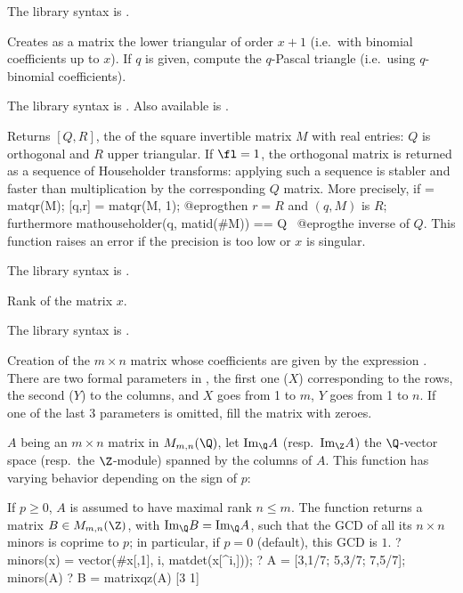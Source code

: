 The library syntax is .

\label{se:matpascal}
Creates as a matrix the lower triangular
 of order $x+1$ (i.e.~with binomial coefficients
up to $x$). If $q$ is given, compute the $q$-Pascal triangle (i.e.~using
$q$-binomial coefficients).

The library syntax is .
Also available is .

\label{se:matqr}
Returns $[Q,R]$, the  of the square invertible
matrix $M$ with real entries: $Q$ is orthogonal and $R$ upper triangular. If
$\fl=1$, the orthogonal matrix is returned as a sequence of Householder
transforms: applying such a sequence is stabler and faster than
multiplication by the corresponding $Q$ matrix.
More precisely, if
\bprog
  [Q,R] = matqr(M);
  [q,r] = matqr(M, 1);
@eprog\noindent then $r = R$ and $(q, M)$ is $R$;
furthermore
\bprog
  mathouseholder(q, matid(#M)) == Q~
@eprog\noindent the inverse of $Q$. This function raises an error if the
precision is too low or $x$ is singular.

The library syntax is .

\label{se:matrank}
Rank of the matrix $x$.

The library syntax is .

\label{se:matrix}
Creation of the
$m\times n$ matrix whose coefficients are given by the expression
. There are two formal parameters in , the first one
($X$) corresponding to the rows, the second ($Y$) to the columns, and $X$
goes from 1 to $m$, $Y$ goes from 1 to $n$. If one of the last 3 parameters
is omitted, fill the matrix with zeroes.

\label{se:matrixqz}
$A$ being an $m\times n$ matrix in $M_{m,n}(\Q)$, let
$\text{Im}_\Q A$ (resp.~$\text{Im}_\Z A$) the $\Q$-vector space
(resp.~the $\Z$-module) spanned by the columns of $A$. This function has
varying behavior depending on the sign of $p$:

If $p \geq 0$, $A$ is assumed to have maximal rank $n\leq m$. The function
returns a matrix $B\in M_{m,n}(\Z)$, with $\text{Im}_\Q B = \text{Im}_\Q A$,
such that the GCD of all its $n\times n$ minors is coprime to
$p$; in particular, if $p = 0$ (default), this GCD is $1$.
\bprog
? minors(x) = vector(#x[,1], i, matdet(x[^i,]));
? A = [3,1/7; 5,3/7; 7,5/7]; minors(A)
? B = matrixqz(A)
[3 1]

